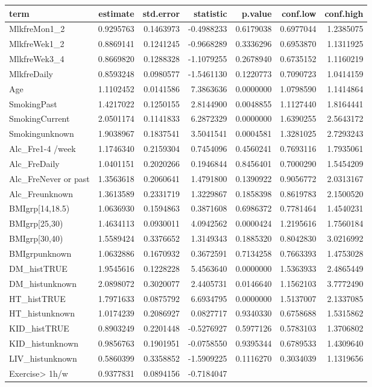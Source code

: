 \documentclass[]{article}
\begin{document}
\begin{longtable}[]{@{}lrrrrrr@{}}
\toprule
term & estimate & std.error & statistic & p.value & conf.low &
conf.high\tabularnewline
\midrule
\endhead
MlkfreMon1\_2 & 0.9295763 & 0.1463973 & -0.4988233 & 0.6179038 &
0.6977044 & 1.2385075\tabularnewline
MlkfreWek1\_2 & 0.8869141 & 0.1241245 & -0.9668289 & 0.3336296 &
0.6953870 & 1.1311925\tabularnewline
MlkfreWek3\_4 & 0.8669820 & 0.1288328 & -1.1079255 & 0.2678940 &
0.6735152 & 1.1160219\tabularnewline
MlkfreDaily & 0.8593248 & 0.0980577 & -1.5461130 & 0.1220773 & 0.7090723
& 1.0414159\tabularnewline
Age & 1.1102452 & 0.0141586 & 7.3863636 & 0.0000000 & 1.0798590 &
1.1414864\tabularnewline
SmokingPast & 1.4217022 & 0.1250155 & 2.8144900 & 0.0048855 & 1.1127440
& 1.8164441\tabularnewline
SmokingCurrent & 2.0501174 & 0.1141833 & 6.2872329 & 0.0000000 &
1.6390255 & 2.5643172\tabularnewline
Smokingunknown & 1.9038967 & 0.1837541 & 3.5041541 & 0.0004581 &
1.3281025 & 2.7293243\tabularnewline
Alc\_Fre1-4 /week & 1.1746340 & 0.2159304 & 0.7454096 & 0.4560241 &
0.7693116 & 1.7935061\tabularnewline
Alc\_FreDaily & 1.0401151 & 0.2020266 & 0.1946844 & 0.8456401 &
0.7000290 & 1.5454209\tabularnewline
Alc\_FreNever or past & 1.3563618 & 0.2060641 & 1.4791800 & 0.1390922 &
0.9056772 & 2.0313167\tabularnewline
Alc\_Freunknown & 1.3613589 & 0.2331719 & 1.3229867 & 0.1858398 &
0.8619783 & 2.1500520\tabularnewline
BMIgrp{[}14,18.5) & 1.0636930 & 0.1594863 & 0.3871608 & 0.6986372 &
0.7781464 & 1.4540231\tabularnewline
BMIgrp{[}25,30) & 1.4634113 & 0.0930011 & 4.0942562 & 0.0000424 &
1.2195616 & 1.7560184\tabularnewline
BMIgrp{[}30,40) & 1.5589424 & 0.3376652 & 1.3149343 & 0.1885320 &
0.8042830 & 3.0216992\tabularnewline
BMIgrpunknown & 1.0632886 & 0.1670932 & 0.3672591 & 0.7134258 &
0.7663393 & 1.4753028\tabularnewline
DM\_histTRUE & 1.9545616 & 0.1228228 & 5.4563640 & 0.0000000 & 1.5363933
& 2.4865449\tabularnewline
DM\_histunknown & 2.0898072 & 0.3020077 & 2.4405731 & 0.0146640 &
1.1562103 & 3.7772490\tabularnewline
HT\_histTRUE & 1.7971633 & 0.0875792 & 6.6934795 & 0.0000000 & 1.5137007
& 2.1337085\tabularnewline
HT\_histunknown & 1.0174239 & 0.2086927 & 0.0827717 & 0.9340330 &
0.6758688 & 1.5315862\tabularnewline
KID\_histTRUE & 0.8903249 & 0.2201448 & -0.5276927 & 0.5977126 &
0.5783103 & 1.3706802\tabularnewline
KID\_histunknown & 0.9856763 & 0.1901951 & -0.0758550 & 0.9395344 &
0.6789533 & 1.4309640\tabularnewline
LIV\_histunknown & 0.5860399 & 0.3358852 & -1.5909225 & 0.1116270 &
0.3034039 & 1.1319656\tabularnewline
Exercise\textgreater{} 1h/w & 0.9377831 & 0.0894156 & -0.7184047 &

\end{longtable}
\end{document}
